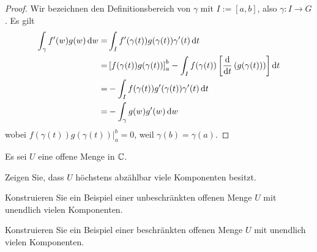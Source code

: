 \begin{proof}
	Wir bezeichnen den Definitionsbereich von $\gamma$ mit $I:=[a,b]$, also $\gamma:I\to G$. Es gilt
	\begin{align*}
		\int_\gamma f'(w)g(w)\dd{w}=&\int_I f'(\gamma(t))g(\gamma(t))\gamma'(t)\dd{t}\\
		=&\left[ f(\gamma(t))g(\gamma(t)) \right]_a^b-\int_I f(\gamma(t))\left[\dv{t}\left( g(\gamma(t)) \right)\right]\dd{t}\\
		=&-\int_I f(\gamma(t))g'(\gamma(t))\gamma'(t)\dd{t}\\
		=&-\int_\gamma g(w)g'(w)\dd{w}
	\end{align*}
	wobei $\left. f(\gamma(t))g(\gamma(t))\right|_a^b=0$, weil $\gamma(b)=\gamma(a)$.
\end{proof}
\iffalse
\begin{Problem}
Für eine nicht-leere Menge $A\subseteq \C$ und einen Punkt $z\in \C$ bezeichne
\[
\text{dist}(z,A):=\inf \{|z-a|:a\in A\} 
\]
den Abstand von $z$ zu $A$. Im Beweis von Korollar 4.8 der Vorlesung wurde folgende Hilfsaussage aus der Analysis verwendet: Es sei $U$ eine offene Menge in $\C$ und $K$ eine nicht-leere kompakte Teilmenge von $U$. Dann gibt es ein $\delta_0>0$ derart, dass die Menge $S_{\delta_0}:=\{z\in \C:\text{dist}(z,K)\le \delta_0\} $ in $U$ enthalten ist. Beweisen Sie diese Aussage. 
\end{Problem}
\begin{proof}
	Wir nehmen an, dass dies falsch ist. D.h. für jedes $\delta_0>0$ ist $S_{\delta_0}\not\subseteq U$. Wir betrachten die $\delta_0=\{1 / n,n\in \N\} $. Für jedes solches $\delta_0$ wählen wir eine offene Überdeckung von $K$ $U=\{B_{\delta_0}(x)|x\in M\} $. Die Überdeckung $U$ hat eine endliche Teilüberdeckung.
\end{proof}
\fi
\begin{Problem}
	Es sei $U$ eine offene Menge in $\C$.
	\begin{parts}
	\item Zeigen Sie, dass $U$ höchstens abzählbar viele Komponenten besitzt.
	\item  Konstruieren Sie ein Beispiel einer unbeschränkten offenen Menge $U$ mit unendlich vielen Komponenten.
	\item Konstruieren Sie ein Beispiel einer beschränkten offenen Menge $U$ mit unendlich vielen Komponenten. 
	\end{parts}
\end{Problem}
